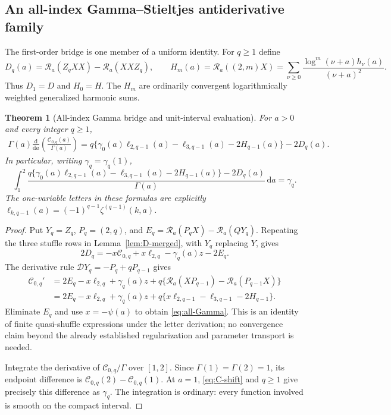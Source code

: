 \documentclass[11pt]{article}
\numberwithin{equation}{section}
\newtheorem{theorem}{Theorem}[section]
\theoremstyle{definition}
\newcommand{\R}{\mathcal R}
\newcommand{\dd}{\,\mathrm d}
\begin{document}
\subsection{An all-index Gamma--Stieltjes antiderivative family}
The first-order bridge is one member of a uniform identity. For $q\ge1$
define
\begin{equation}\label{eq:Dq-Hm}
 D_q(a)=\R_a(Z_qXX)-\R_a(XXZ_q),\qquad
 H_m(a)=\R_a((2,m)X)=\sum_{\nu\ge0}
             \frac{\log^m(\nu+a)h_\nu(a)}{(\nu+a)^2}.
\end{equation}
Thus $D_1=D$ and $H_0=H$. The $H_m$ are ordinarily convergent
logarithmically weighted generalized harmonic sums.

\begin{theorem}[All-index Gamma bridge and unit-interval evaluation]
\label{thm:all-Gamma}
For $a>0$ and every integer $q\ge1$,
\begin{align}\label{eq:all-Gamma}
 \Gamma(a)\frac{\mathrm d}{\mathrm da}
       \left(\frac{\mathcal C_{0,q}(a)}{\Gamma(a)}\right)
 =q\bigl\{\gamma_0(a)\ell_{2,q-1}(a)
          -\ell_{3,q-1}(a)-2H_{q-1}(a)\bigr\}-2D_q(a).
\end{align}
In particular, writing $\gamma_q=\gamma_q(1)$,
\begin{equation}\label{eq:unit-Stieltjes-integral}
 \boxed{\displaystyle
 \int_1^2
 \frac{q\{\gamma_0(a)\ell_{2,q-1}(a)-\ell_{3,q-1}(a)-2H_{q-1}(a)\}
                  -2D_q(a)}{\Gamma(a)}\dd a=\gamma_q.}
\end{equation}
The one-variable letters in these formulas are explicitly
$\ell_{k,q-1}(a)=(-1)^{q-1}\zeta^{(q-1)}(k,a)$.
\end{theorem}
\begin{proof}
Put $Y_q=Z_q$, $P_q=(2,q)$, and
$E_q=\R_a(P_qX)-\R_a(QY_q)$. Repeating the three stuffle rows in
Lemma~\ref{lem:D-merged}, with $Y_q$ replacing $Y$, gives
\[
 2D_q=-x\mathcal C_{0,q}+x\ell_{2,q}-\gamma_q(a)z-2E_q.
\]
The derivative rule $\mathcal DY_q=-P_q+qP_{q-1}$ gives
\begin{align*}
 \mathcal C_{0,q}'
 &=2E_q-x\ell_{2,q}+\gamma_q(a)z
          +q\{\R_a(XP_{q-1})-\R_a(P_{q-1}X)\}\\
 &=2E_q-x\ell_{2,q}+\gamma_q(a)z
          +q\{x\ell_{2,q-1}-\ell_{3,q-1}-2H_{q-1}\}.
\end{align*}
Eliminate $E_q$ and use $x=-\psi(a)$ to obtain
\eqref{eq:all-Gamma}. This is an identity of finite quasi-shuffle
expressions under the letter derivation; no convergence claim beyond the
already established regularization and parameter transport is needed.

Integrate the derivative of $\mathcal C_{0,q}/\Gamma$ over $[1,2]$.
Since $\Gamma(1)=\Gamma(2)=1$, its endpoint difference is
$\mathcal C_{0,q}(2)-\mathcal C_{0,q}(1)$. At $a=1$,
\eqref{eq:C-shift} and $q\ge1$ give precisely this difference as
$\gamma_q$. The integration is ordinary: every function involved is
smooth on the compact interval.
\end{proof}
\end{document}
